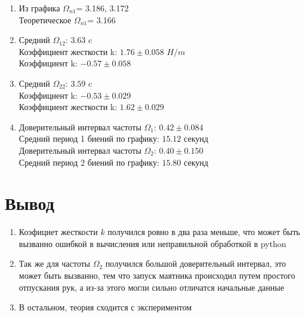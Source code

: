 \documentclass[a4paper]{article}
\begin{document}
\center
\begin{enumerate}
\item
Из графика $\Omega_{n1}$= 3.186, 3.172\\
Теоретическое $\Omega_{n1}$= 3.166
\item
Средний $\Omega_{12}$: $3.63$ c\\
Коэффициент жесткости k: $1.76 \pm 0.058$ $H/m$\\
Коэффициент k: $-0.57 \pm 0.058$\\
\item
Средний $\Omega_{22}$: $3.59$ c \\
Коэффициент k: $-0.53 \pm 0.029$\\
Коэффициент жесткости k: $1.62 \pm 0.029$\\


\item
Доверительный интервал частоты $\Omega_{1}$: $0.42 \pm 0.084$\\
Средний период 1 биений по графику: $15.12$ секунд\\

Доверительный интервал частоты $\Omega_{2}$: $0.40 \pm 0.150$\\
Средний период 2 биений по графику: $15.80$ секунд
\end{enumerate}


\section{\textbf{Вывод}}

\begin{enumerate}
    \item Коэфициет жесткости $k$ получился ровно в два раза меньше, что может быть вызванно ошибкой в вычисления или неправильной обработкой в python
    \item Так же для частоты $\Omega_2$ получился большой доверительный интервал, это может быть вызванно, тем что запуск маятника происходил путем простого отпускания рук, а из-за этого могли сильно отличатся начальные данные
    \item В остальном, теория сходится с экспериментом
\end{enumerate}
\end{document}
